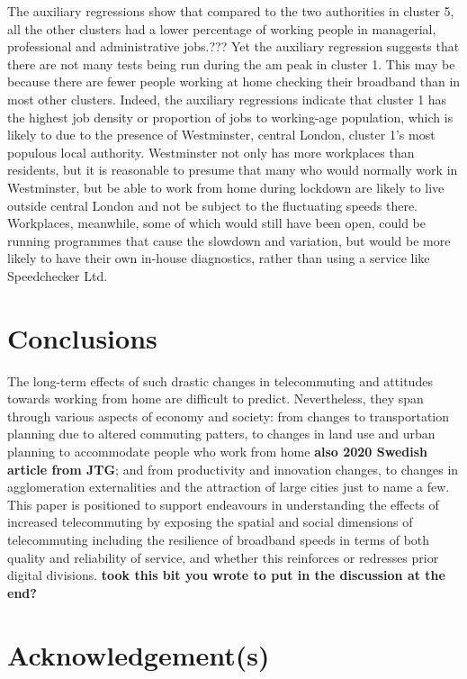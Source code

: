 \documentclass[]{interact}
\theoremstyle{plain}%
\theoremstyle{definition}
\theoremstyle{remark}
\begin{document}
The auxiliary regressions show that compared to the two authorities in
cluster 5, all the other clusters had a lower percentage of working
people in managerial, professional and administrative jobs.??? Yet the
auxiliary regression suggests that there are not many tests being run
during the am peak in cluster 1. This may be because there are fewer
people working at home checking their broadband than in most other
clusters. Indeed, the auxiliary regressions indicate that cluster 1 has
the highest job density or proportion of jobs to working-age population,
which is likely to due to the presence of Westminster, central London,
cluster 1's most populous local authority. Westminster not only has more
workplaces than residents, but it is reasonable to presume that many who
would normally work in Westminster, but be able to work from home during
lockdown are likely to live outside central London and not be subject to
the fluctuating speeds there. Workplaces, meanwhile, some of which would
still have been open, could be running programmes that cause the
slowdown and variation, but would be more likely to have their own
in-house diagnostics, rather than using a service like Speedchecker Ltd.

\hypertarget{conclusions}{%
\section{Conclusions}\label{conclusions}}

The long-term effects of such drastic changes in telecommuting and
attitudes towards working from home are difficult to predict.
Nevertheless, they span through various aspects of economy and society:
from changes to transportation planning due to altered commuting
patters, to changes in land use and urban planning to accommodate people
who work from home \citep{BUDNITZ2020102713}\textbf{also 2020 Swedish
article from JTG}; and from productivity and innovation changes, to
changes in agglomeration externalities and the attraction of large
cities \citep{econobs} just to name a few. This paper is positioned to
support endeavours in understanding the effects of increased
telecommuting by exposing the spatial and social dimensions of
telecommuting including the resilience of broadband speeds in terms of
both quality and reliability of service, and whether this reinforces or
redresses prior digital divisions. \textbf{took this bit you wrote to
put in the discussion at the end?}

\hypertarget{acknowledgements}{%
\section*{Acknowledgement(s)}\label{acknowledgements}}
\end{document}
